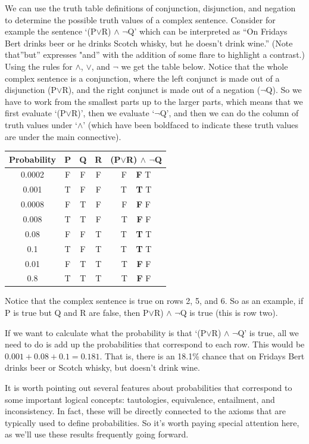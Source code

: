\documentclass[]{tufte-book}
\begin{document}
We can use the truth table definitions of conjunction, disjunction, and negation to determine the possible truth values of a complex sentence. Consider for example the sentence `(P\(\vee\)R) \(\wedge\) \(\neg\)Q' which can be interpreted as ``On Fridays Bert drinks beer or he drinks Scotch whisky, but he doesn't drink wine.'' (Note that''but'' expresses "and'' with the addition of some flare to highlight a contrast.) Using the rules for \(\wedge\), \(\vee\), and \(\neg\) we get the table below. Notice that the whole complex sentence is a conjunction, where the left conjunct is made out of a disjunction (P\(\vee\)R), and the right conjunct is made out of a negation (\(\neg\)Q). So we have to work from the smallest parts up to the larger parts, which means that we first evaluate `(P\(\vee\)R)', then we evaluate `\(\neg\)Q', and then we can do the column of truth values under `\(\wedge\)' (which have been boldfaced to indicate these truth values are under the main connective).

\begin{longtable}[]{@{}ccccc@{}}
\toprule
Probability & P & Q & R & (P\(\vee\)R) \(\wedge\) \(\neg\)Q\tabularnewline
\midrule
\endhead
0.0002 & F & F & F & F \(~~\) \textbf{F} T\tabularnewline
0.001 & T & F & F & T \(~~\) \textbf{T} T\tabularnewline
0.0008 & F & T & F & F \(~~\) \textbf{F} F\tabularnewline
0.008 & T & T & F & T \(~~\) \textbf{F} F\tabularnewline
0.08 & F & F & T & T \(~~\) \textbf{T} T\tabularnewline
0.1 & T & F & T & T \(~~\) \textbf{T} T\tabularnewline
0.01 & F & T & T & T \(~~\) \textbf{F} F\tabularnewline
0.8 & T & T & T & T \(~~\) \textbf{F} F\tabularnewline
\bottomrule
\end{longtable}

Notice that the complex sentence is true on rows 2, 5, and 6. So as an example, if P is true but Q and R are false, then P\(\vee\)R) \(\wedge\) \(\neg\)Q is true (this is row two).

If we want to calculate what the probability is that `(P\(\vee\)R) \(\wedge\) \(\neg\)Q' is true, all we need to do is add up the probabilities that correspond to each row. This would be \(0.001+0.08+0.1 = 0.181\). That is, there is an 18.1\% chance that on Fridays Bert drinks beer or Scotch whisky, but doesn't drink wine.

It is worth pointing out several features about probabilities that correspond to some important logical concepts: tautologies, equivalence, entailment, and inconsistency. In fact, these will be directly connected to the axioms that are typically used to define probabilities. So it's worth paying special attention here, as we'll use these results frequently going forward.
\end{document}
